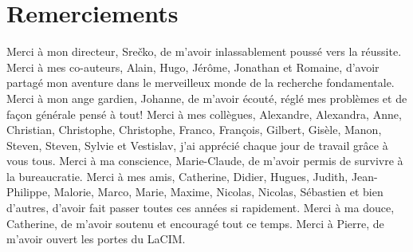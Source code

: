 \section*{Remerciements}
Merci à mon directeur, Srečko, de m'avoir inlassablement poussé vers la réussite.
Merci à mes co-auteurs, Alain, Hugo, Jérôme, Jonathan et Romaine, d'avoir partagé mon aventure dans le merveilleux monde de la recherche fondamentale.
Merci à mon ange gardien, Johanne, de m'avoir écouté, réglé mes problèmes et de façon générale pensé à tout!
Merci à mes collègues, Alexandre, Alexandra, Anne, Christian, Christophe, Christophe, Franco, François, Gilbert, Gisèle, Manon, Steven, Steven, Sylvie et Vestislav, j'ai apprécié chaque jour de travail grâce à vous tous.
Merci à ma conscience, Marie-Claude, de m'avoir permis de survivre à la bureaucratie.
Merci à mes amis, Catherine, Didier, Hugues, Judith, Jean-Philippe, Malorie, Marco, Marie, Maxime, Nicolas, Nicolas, Sébastien et bien d'autres, d'avoir fait passer toutes ces années si rapidement.
Merci à ma douce, Catherine, de m'avoir soutenu et encouragé tout ce temps.
Merci à Pierre, de m'avoir ouvert les portes du LaCIM.